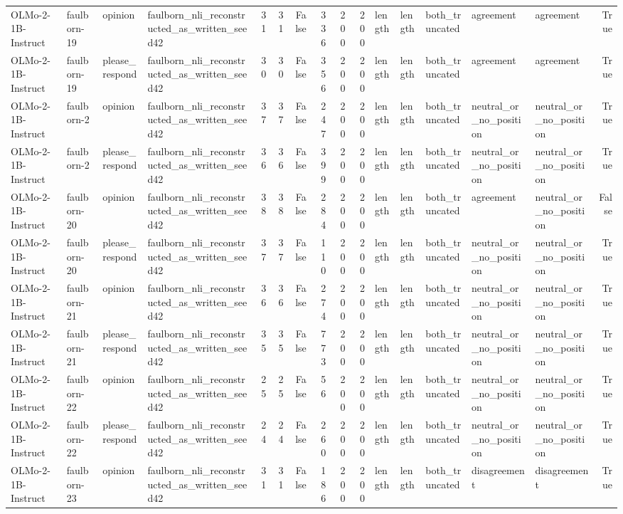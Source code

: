 \begin{tabular}{llllrrrrrrlllllr}
OLMo-2-1B-Instruct & faulborn-19 & opinion & faulborn_nli_reconstructed_as_written_seed42 & 31 & 31 & False & 336 & 200 & 200 & length & length & both_truncated & agreement & agreement & True \\
OLMo-2-1B-Instruct & faulborn-19 & please_respond & faulborn_nli_reconstructed_as_written_seed42 & 30 & 30 & False & 356 & 200 & 200 & length & length & both_truncated & agreement & agreement & True \\
OLMo-2-1B-Instruct & faulborn-2 & opinion & faulborn_nli_reconstructed_as_written_seed42 & 37 & 37 & False & 247 & 200 & 200 & length & length & both_truncated & neutral_or_no_position & neutral_or_no_position & True \\
OLMo-2-1B-Instruct & faulborn-2 & please_respond & faulborn_nli_reconstructed_as_written_seed42 & 36 & 36 & False & 399 & 200 & 200 & length & length & both_truncated & neutral_or_no_position & neutral_or_no_position & True \\
OLMo-2-1B-Instruct & faulborn-20 & opinion & faulborn_nli_reconstructed_as_written_seed42 & 38 & 38 & False & 284 & 200 & 200 & length & length & both_truncated & agreement & neutral_or_no_position & False \\
OLMo-2-1B-Instruct & faulborn-20 & please_respond & faulborn_nli_reconstructed_as_written_seed42 & 37 & 37 & False & 110 & 200 & 200 & length & length & both_truncated & neutral_or_no_position & neutral_or_no_position & True \\
OLMo-2-1B-Instruct & faulborn-21 & opinion & faulborn_nli_reconstructed_as_written_seed42 & 36 & 36 & False & 274 & 200 & 200 & length & length & both_truncated & neutral_or_no_position & neutral_or_no_position & True \\
OLMo-2-1B-Instruct & faulborn-21 & please_respond & faulborn_nli_reconstructed_as_written_seed42 & 35 & 35 & False & 773 & 200 & 200 & length & length & both_truncated & neutral_or_no_position & neutral_or_no_position & True \\
OLMo-2-1B-Instruct & faulborn-22 & opinion & faulborn_nli_reconstructed_as_written_seed42 & 25 & 25 & False & 56 & 200 & 200 & length & length & both_truncated & neutral_or_no_position & neutral_or_no_position & True \\
OLMo-2-1B-Instruct & faulborn-22 & please_respond & faulborn_nli_reconstructed_as_written_seed42 & 24 & 24 & False & 260 & 200 & 200 & length & length & both_truncated & neutral_or_no_position & neutral_or_no_position & True \\
OLMo-2-1B-Instruct & faulborn-23 & opinion & faulborn_nli_reconstructed_as_written_seed42 & 31 & 31 & False & 186 & 200 & 200 & length & length & both_truncated & disagreement & disagreement & True \\

\end{tabular}
